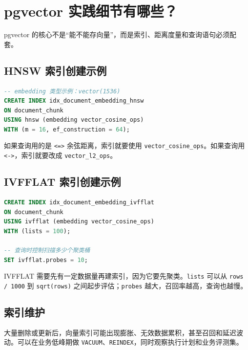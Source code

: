 \documentclass[9pt,a4paper,twocolumn]{ctexart}
\begin{document}
\section*{pgvector 实践细节有哪些？}


pgvector 的核心不是“能不能存向量”，而是索引、距离度量和查询语句必须配套。



\subsection*{HNSW 索引创建示例}


\begin{lstlisting}[language=SQL]
-- embedding 类型示例：vector(1536)
CREATE INDEX idx_document_embedding_hnsw
ON document_chunk
USING hnsw (embedding vector_cosine_ops)
WITH (m = 16, ef_construction = 64);
\end{lstlisting}



如果查询用的是 \texttt{<=>} 余弦距离，索引就要使用 \texttt{vector\_cosine\_ops}。如果查询用 \texttt{<->}，索引就要改成 \texttt{vector\_l2\_ops}。



\subsection*{IVFFLAT 索引创建示例}


\begin{lstlisting}[language=SQL]
CREATE INDEX idx_document_embedding_ivfflat
ON document_chunk
USING ivfflat (embedding vector_cosine_ops)
WITH (lists = 100);

-- 查询时控制扫描多少个聚类桶
SET ivfflat.probes = 10;
\end{lstlisting}



IVFFLAT 需要先有一定数据量再建索引，因为它要先聚类。\texttt{lists} 可以从 \texttt{rows / 1000} 到 \texttt{sqrt(rows)} 之间起步评估；\texttt{probes} 越大，召回率越高，查询也越慢。



\subsection*{索引维护}


大量删除或更新后，向量索引可能出现膨胀、无效数据累积，甚至召回和延迟波动。可以在业务低峰期做 \texttt{VACUUM}、\texttt{REINDEX}，同时观察执行计划和业务评测集。
\end{document}
